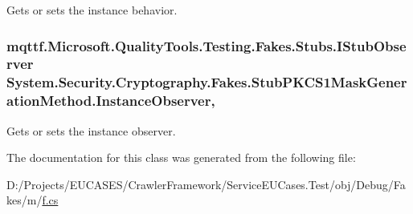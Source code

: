 Gets or sets the instance behavior.

\hypertarget{class_system_1_1_security_1_1_cryptography_1_1_fakes_1_1_stub_p_k_c_s1_mask_generation_method_afda702e88de56ee8ff6bc47fcdbdc054}{
\subsubsection[{Instance\-Observer}]{\setlength{\rightskip}{0pt plus 5cm}mqttf.\-Microsoft.\-Quality\-Tools.\-Testing.\-Fakes.\-Stubs.\-I\-Stub\-Observer System.\-Security.\-Cryptography.\-Fakes.\-Stub\-P\-K\-C\-S1\-Mask\-Generation\-Method.\-Instance\-Observer\hspace{0.3cm}{\ttfamily [get]}, {\ttfamily [set]}}}\label{class_system_1_1_security_1_1_cryptography_1_1_fakes_1_1_stub_p_k_c_s1_mask_generation_method_afda702e88de56ee8ff6bc47fcdbdc054}


Gets or sets the instance observer.



The documentation for this class was generated from the following file\-:\begin{DoxyCompactItemize}
\item 
D\-:/\-Projects/\-E\-U\-C\-A\-S\-E\-S/\-Crawler\-Framework/\-Service\-E\-U\-Cases.\-Test/obj/\-Debug/\-Fakes/m/\hyperlink{m_2f_8cs}{f.\-cs}\end{DoxyCompactItemize}
